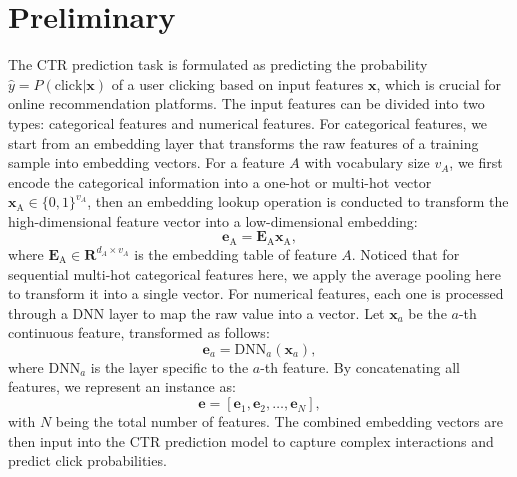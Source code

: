 \section{Preliminary}

The CTR prediction task is formulated as predicting the probability $\hat{y} = P(\text{click} | \mathbf{x})$ of a user clicking based on input features $\mathbf{x}$, which is crucial for online recommendation platforms. 
The input features can be divided into two types: categorical features and numerical features.
For categorical features, we start from an embedding layer that transforms the raw features of a training sample into embedding vectors. 
For a feature $A$ with vocabulary size $v_A$, we first encode the categorical information into a one-hot or multi-hot vector $\mathbf{x}_{\text{A}} \in \{0,1\}^{v_A}$, then an embedding lookup operation is conducted to transform the high-dimensional feature vector into a low-dimensional embedding:
\begin{equation}
\mathbf{e}_\text{A} = \mathbf{E}_\text{A} \mathbf{x}_\text{A},
\end{equation}
where $\mathbf{E}_\text{A} \in \mathbf{R}^{d_A \times v_A}$ is the embedding table of feature $A$.
Noticed that for sequential multi-hot categorical features here, we apply the average pooling here to transform it into a single vector.
For numerical features, each one is processed through a DNN layer to map the raw value into a vector. Let $\mathbf{x}_{a}$ be the $a$-th continuous feature, transformed as follows:
\begin{equation}
\mathbf{e}_{a} = \text{DNN}_a(\mathbf{x}_{a}),
\end{equation}
where $\text{DNN}_a$ is the layer specific to the $a$-th feature.
By concatenating all features, we represent an instance as:
\begin{equation}
\mathbf{e} = [\mathbf{e}_{1}, \mathbf{e}_{2}, \ldots, \mathbf{e}_{N}],
\end{equation}
with $N$ being the total number of features. The combined embedding vectors are then input into the CTR prediction model to capture complex interactions and predict click probabilities.
